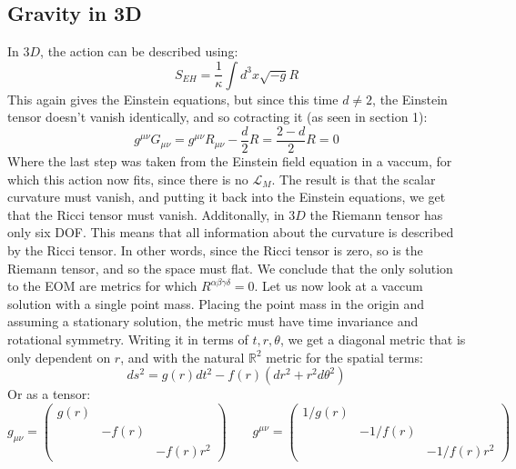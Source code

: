 \documentclass{article}
\newcommand{\R}{\ensuremath{\mathbb{R}}}
\begin{document}
\subsection{Gravity in 3D}
In $3D$, the action can be described using:
\begin{equation}
    S_{EH} = \frac{1}{\kappa}\int d^3x\sqrt{-g}R
\end{equation}
This again gives the Einstein equations, but since this time $d \ne 2$, the Einstein tensor doesn't vanish identically, and so cotracting it (as seen in section 1):
\begin{equation}
    g^{\mu\nu}G_{\mu\nu} = g^{\mu\nu}R_{\mu\nu} - \frac{d}{2}R = \frac{2 - d}{2}R = 0
\end{equation}
Where the last step was taken from the Einstein field equation in a vaccum, for which this action now fits, since there is no $\mathcal{L}_M$. The result is that the scalar curvature must vanish, and putting it back into the Einstein equations, we get that the Ricci tensor must vanish.
\newline
Additonally, in $3D$ the Riemann tensor has only six DOF. This means that all information about the curvature is described by the Ricci tensor. In other words, since the Ricci tensor is zero, so is the Riemann tensor, and so the space must flat. We conclude that the only solution to the EOM are metrics for which $R^{\alpha\beta\gamma\delta} = 0$.
\newline
\newline
Let us now look at a vaccum solution with a single point mass. Placing the point mass in the origin and assuming a stationary solution, the metric must have time invariance and rotational symmetry. Writing it in terms of $t, r, \theta$, we get a diagonal metric that is only dependent on $r$, and with the natural $\R^2$ metric for the spatial terms:
\begin{equation}
    ds^2 = g(r)dt^2 - f(r)\left(dr^2 + r^2d\theta^2\right)
\end{equation}
Or as a tensor:
\begin{equation}
    g_{\mu\nu} = \begin{pmatrix}
        g(r) & & \\ & -f(r) & \\ & & -f(r)r^2
    \end{pmatrix}
    \qquad
    g^{\mu\nu} = \begin{pmatrix}
        1/g(r) & & \\ & -1/f(r) & \\ & & -1/f(r)r^2
    \end{pmatrix}
\end{equation}
\end{document}
